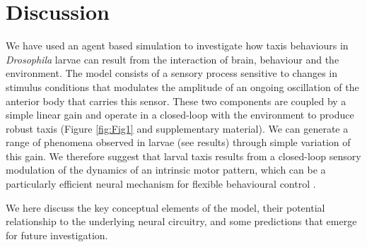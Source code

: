 \documentclass[10pt,a4paper]{article}
\newcommand{\Dros }{\emph{Drosophila }}
\begin{document}
\section{Discussion}
We have used an agent based simulation to investigate how taxis behaviours in \Dros larvae can result from the interaction of brain, behaviour and the environment. 
 The model consists of a sensory process sensitive to changes in stimulus conditions that modulates the amplitude of an ongoing oscillation of the anterior body that carries this sensor.
These two components are coupled by a simple linear gain and operate in a closed-loop with the environment to produce robust taxis (Figure \ref{fig:Fig1} and supplementary material). We can generate a range of phenomena observed in larvae (see results) through simple variation of this gain.
We therefore suggest that larval taxis results from a closed-loop sensory modulation of the dynamics of an intrinsic motor pattern, which can be a particularly efficient neural mechanism for flexible behavioural control \citep{lemon2015whole,izquierdo2010evolution,kanzaki1996behavioral,levi2005role,willis1997active}. 

 We here discuss the key conceptual elements of the model, their potential relationship to the underlying neural circuitry, and some predictions that emerge for future investigation.
\end{document}
